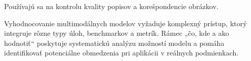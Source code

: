 \documentclass[]{tukediphc}
\begin{document}
Používajú sa na kontrolu kvality popisov a korešpondencie obrázkov\cite{researchgate:A_Survey_on_Evaluation_of_Multimodal_Large_Language_Models}.

Vyhodnocovanie multimodálnych modelov vyžaduje komplexný prístup, ktorý integruje rôzne typy úloh, benchmarkov a metrík. Rámec „čo, kde a ako hodnotiť“ poskytuje systematickú analýzu možností modelu a pomáha identifikovať potenciálne obmedzenia pri aplikácii v reálnych podmienkach.


\end{document}
